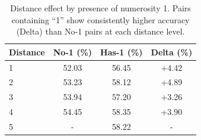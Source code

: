 \begin{table}[ht]
  \centering
  \small
\caption{Distance effect by presence of numerosity 1. Pairs containing
``1'' show consistently higher accuracy (Delta) than No-1 pairs
at each distance level.}
  \label{tab:distance-one-interaction}
  \begin{tabular}{lccc}
    \toprule
    Distance & No-1 (\%) & Has-1 (\%) & Delta (\%) \\
    \midrule
    1 & 52.03 & 56.45 & +4.42 \\
    2 & 53.23 & 58.12 & +4.89 \\
    3 & 53.94 & 57.20 & +3.26 \\
    4 & 54.45 & 58.35 & +3.90 \\
    5 & - & 58.22 & - \\
    \bottomrule
  \end{tabular}
\end{table}
